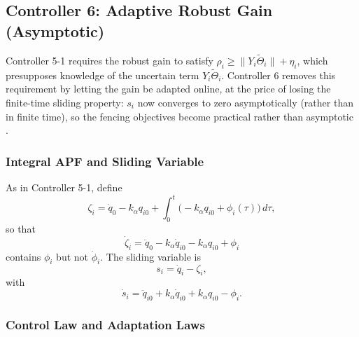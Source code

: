 \subsection{Controller 6: Adaptive Robust Gain (Asymptotic)}
\label{sec: controller6}

Controller 5-1 requires the robust gain to satisfy
$\rho_i \ge \|Y_i\tilde{\Theta}_i\| + \eta_i$, which presupposes knowledge of the uncertain
term $Y_i\tilde{\Theta}_i$. Controller 6 removes this requirement by letting the gain be
adapted online, at the price of losing the finite-time sliding property: $s_i$ now converges
to zero asymptotically (rather than in finite time), so the fencing objectives become
practical rather than asymptotic \cite{slotineLiAppliedNonlinearControl1991}.

\subsubsection{Integral APF and Sliding Variable}

As in Controller 5-1, define
\begin{equation}\label{eq6:zeta}
	\zeta_i = \dot{q}_0 - k_\alpha q_{i0}
	+ \int_0^t \bigl(-k_\alpha q_{i0} + \phi_i(\tau)\bigr)\,d\tau,
\end{equation}
so that
\begin{equation}\label{eq6:zeta_dot}
	\dot{\zeta}_i = \ddot{q}_0 - k_\alpha \dot{q}_{i0} - k_\alpha q_{i0} + \phi_i
\end{equation}
contains $\phi_i$ but not $\dot{\phi}_i$. The sliding variable is
\begin{equation}\label{eq6:sliding_var}
	s_i = \dot{q}_i - \zeta_i,
\end{equation}
with
\begin{equation}\label{eq6:s_dot_def}
	\dot{s}_i = \ddot{q}_{i0} + k_\alpha \dot{q}_{i0} + k_\alpha q_{i0} - \phi_i.
\end{equation}

\subsubsection{Control Law and Adaptation Laws}

